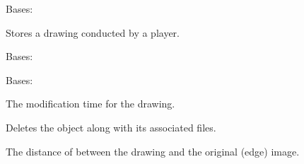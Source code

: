 \documentclass[letterpaper,10pt,english]{sphinxmanual}
\begin{document}
\begin{fulllineitems}
\label{Contour.contour:Contour.contour.models.Drawing}
Bases: 

Stores a drawing conducted by a player.

\begin{fulllineitems}
\label{Contour.contour:Contour.contour.models.Drawing.DoesNotExist}
Bases: 

\end{fulllineitems}


\begin{fulllineitems}
\label{Contour.contour:Contour.contour.models.Drawing.MultipleObjectsReturned}
Bases: 

\end{fulllineitems}


\begin{fulllineitems}
\label{Contour.contour:Contour.contour.models.Drawing.datetime}
The modification time for the drawing.

\end{fulllineitems}


\begin{fulllineitems}
\label{Contour.contour:Contour.contour.models.Drawing.delete}
Deletes the {\hyperref[Contour.contour:Contour.contour.models.Drawing]{}} object along with its associated files.

\end{fulllineitems}


\begin{fulllineitems}
\label{Contour.contour:Contour.contour.models.Drawing.distance}
The distance of between the drawing and the original (edge) image.


\end{fulllineitems}
\end{fulllineitems}
\end{document}
